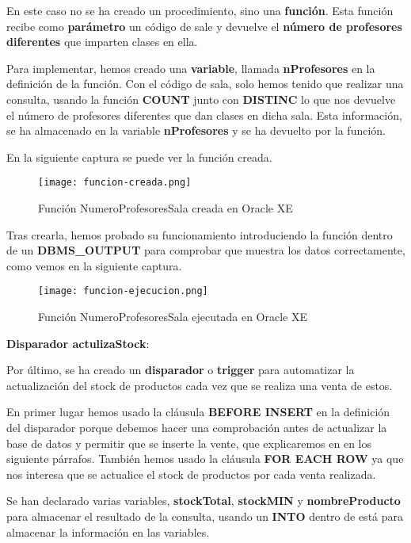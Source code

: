 \begin{enumerate}[label=\Alph*)]
    En este caso no se ha creado un procedimiento, sino una \textbf{función}. Esta función recibe como \textbf{parámetro} un código de sale y devuelve el \textbf{número de profesores diferentes} que imparten clases en ella.

    Para implementar, hemos creado una \textbf{variable}, llamada \textbf{nProfesores} en la definición de la función. Con el código de sala, solo hemos tenido que realizar una consulta, usando la función \textbf{COUNT} junto con \textbf{DISTINC} lo que nos devuelve el número de profesores diferentes que dan clases en dicha sala. Esta información, se ha almacenado en la variable \textbf{nProfesores} y se ha devuelto por la función.

    En la siguiente captura se puede ver la función creada.

    \begin{figure}[H]
        \centering
        \texttt{[image: funcion-creada.png]}
        \caption{Función NumeroProfesoresSala creada en Oracle XE}
    \end{figure}

    Tras crearla, hemos probado su funcionamiento introduciendo la función dentro de un \textbf{DBMS\_OUTPUT} para comprobar que muestra los datos correctamente, como vemos en la siguiente captura.

    \begin{figure}[H]
        \centering
        \texttt{[image: funcion-ejecucion.png]}
        \caption{Función NumeroProfesoresSala ejecutada en Oracle XE}
    \end{figure}

    \textbf{Disparador actulizaStock}:

    Por último, se ha creado un \textbf{disparador} o \textbf{trigger} para automatizar la actualización del stock de productos cada vez que se realiza una venta de estos.

    En primer lugar hemos usado la cláusula \textbf{BEFORE INSERT} en la definición del disparador porque debemos hacer una comprobación antes de actualizar la base de datos y permitir que se inserte la vente, que explicaremos en en los siguiente párrafos. También hemos usado la cláusula \textbf{FOR EACH ROW} ya que nos interesa que se actualice el stock de productos por cada venta realizada.

    Se han declarado varias variables, \textbf{stockTotal}, \textbf{stockMIN} y \textbf{nombreProducto} para almacenar el resultado de la consulta, usando un \textbf{INTO} dentro de está para almacenar la información en las variables.


\end{enumerate}
